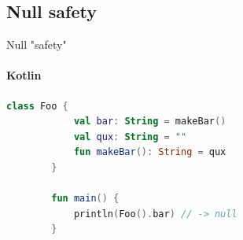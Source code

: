 \documentclass[compress,12pt,xcolor={dvipsnames}]{beamer}
\begin{document}
\subsection{Null safety}
\begin{frame}[fragile]{Null "safety"}
    \framesubtitle{Kotlin}
    \begin{lstlisting}[gobble=8,language=Kotlin,basicstyle=\footnotesize]
        class Foo {
            val bar: String = makeBar()
            val qux: String = ""
            fun makeBar(): String = qux
        }
        
        fun main() {
            println(Foo().bar) // -> null
        }
        \end{lstlisting}
\end{frame}
\end{document}
